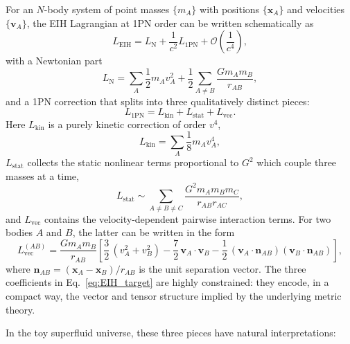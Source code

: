\documentclass[11pt]{article}
\newcommand{\PN}{\mathrm{PN}}
\begin{document}
For an $N$-body system of point masses $\{m_A\}$ with positions
$\{\mathbf{x}_A\}$ and velocities $\{\mathbf{v}_A\}$, the EIH
Lagrangian at 1PN order can be written schematically as
\begin{equation}
  L_{\text{EIH}}
  = L_{\text{N}}
    + \frac{1}{c^2} L_{1\PN}
  + \mathcal{O}\!\left(\frac{1}{c^4}\right),
\end{equation}
with a Newtonian part
\begin{equation}
  L_{\text{N}}
  = \sum_A \frac{1}{2} m_A v_A^2
    + \frac{1}{2}\sum_{A\neq B}
      \frac{G m_A m_B}{r_{AB}},
\end{equation}
and a 1PN correction that splits into three qualitatively distinct
pieces:
\begin{equation}
  L_{1\PN}
  = L_{\text{kin}}
    + L_{\text{stat}}
    + L_{\text{vec}}.
\end{equation}
Here $L_{\text{kin}}$ is a purely kinetic correction of order $v^4$,
\begin{equation}
  L_{\text{kin}}
  = \sum_A \frac{1}{8} m_A v_A^4,
\end{equation}
$L_{\text{stat}}$ collects the static nonlinear terms proportional
to $G^2$ which couple three masses at a time,
\begin{equation}
  L_{\text{stat}}
  \sim \sum_{A\neq B\neq C}
       \frac{G^2 m_A m_B m_C}{r_{AB} r_{AC}},
\end{equation}
and $L_{\text{vec}}$ contains the velocity-dependent pairwise
interaction terms.
For two bodies $A$ and $B$, the latter can be written in the form
\begin{equation}
  L_{\text{vec}}^{(AB)}
  = \frac{G m_A m_B}{r_{AB}}
    \left[
      \frac{3}{2}\,(v_A^2 + v_B^2)
      - \frac{7}{2}\,\mathbf{v}_A\cdot\mathbf{v}_B
      - \frac{1}{2}\,
        (\mathbf{v}_A\cdot\mathbf{n}_{AB})
        (\mathbf{v}_B\cdot\mathbf{n}_{AB})
    \right],
  \label{eq:EIH_target}
\end{equation}
where $\mathbf{n}_{AB} = (\mathbf{x}_A-\mathbf{x}_B)/r_{AB}$ is the
unit separation vector.
The three coefficients in Eq.~\eqref{eq:EIH_target} are highly
constrained: they encode, in a compact way, the vector and tensor
structure implied by the underlying metric theory.

In the toy superfluid universe, these three pieces have natural
interpretations:
\end{document}
